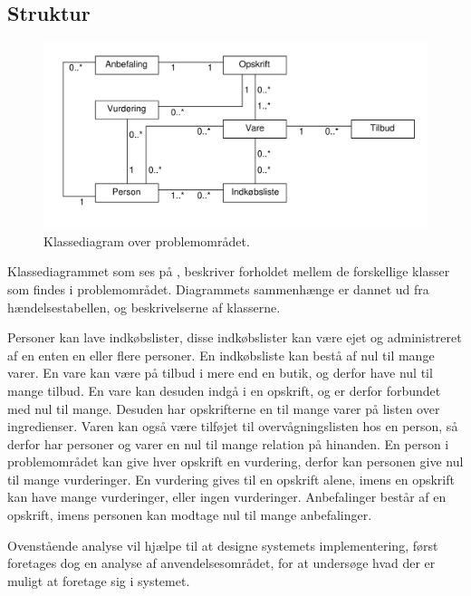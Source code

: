 \subsection{Struktur}\label{sec:struktur}
\begin{figure}
	\centering
		\includegraphics[scale=0.6]{images/Diagrams/klassediagram_model_simple.pdf}
	\caption{Klassediagram over problemområdet.}
	\label{figur:PDklasse}
\end{figure}

Klassediagrammet som ses på , beskriver forholdet mellem de forskellige klasser som findes i problemområdet.
Diagrammets sammenhænge er dannet ud fra hændelsestabellen, og beskrivelserne af klasserne.

Personer kan lave indkøbslister, disse indkøbslister kan være ejet og administreret af en enten en eller flere personer.
En indkøbsliste kan bestå af nul til mange varer.
En vare kan være på tilbud i mere end en butik, og derfor have nul til mange tilbud.
En vare kan desuden indgå i en opskrift, og er derfor forbundet med nul til mange.
Desuden har opskrifterne en til mange varer på listen over ingredienser.
Varen kan også være tilføjet til overvågningslisten hos en person, så derfor har personer og varer en nul til mange relation på hinanden.
En person i problemområdet kan give hver opskrift en vurdering, derfor kan personen give nul til mange vurderinger.
En vurdering gives til en opskrift alene, imens en opskrift kan have mange vurderinger, eller ingen vurderinger.
Anbefalinger består af en opskrift, imens personen kan modtage nul til mange anbefalinger.


Ovenstående analyse vil hjælpe til at designe systemets implementering, først foretages dog en analyse af anvendelsesområdet, for at undersøge hvad der er muligt at foretage sig i systemet.

